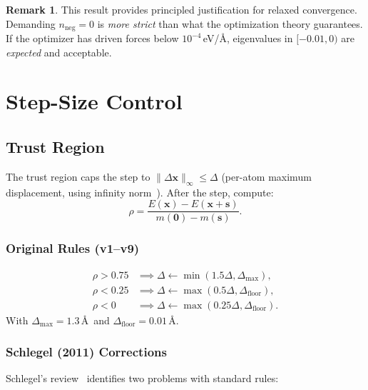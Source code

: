 \documentclass[11pt,a4paper]{article}
\newcommand{\vect}[1]{\bm{#1}}
\newcommand{\norm}[1]{\lVert #1 \rVert}
\theoremstyle{definition}
\newtheorem{remark}{Remark}
\begin{document}
\begin{remark}
  This result provides principled justification for relaxed convergence.
  Demanding $n_\text{neg}=0$ is \emph{more strict} than what the optimization
  theory guarantees.  If the optimizer has driven forces below $10^{-4}$\,eV/\AA,
  eigenvalues in $[-0.01, 0)$ are \emph{expected} and acceptable.
\end{remark}

\section{Step-Size Control}
\label{sec:step-control}

\subsection{Trust Region}
\label{sec:trust-region}

The trust region caps the step to $\norm{\Delta\vect{x}}_\infty \leq \Delta$
(per-atom maximum displacement, using infinity norm~\citep{sella}).  After the
step, compute:
\begin{equation}
  \rho = \frac{E(\vect{x}) - E(\vect{x}+\vect{s})}{m(\vect{0}) - m(\vect{s})}.
\end{equation}

\subsubsection{Original Rules (v1--v9)}
\begin{align}
  \rho > 0.75 &\implies \Delta \gets \min(1.5\Delta, \Delta_\text{max}), \\
  \rho < 0.25 &\implies \Delta \gets \max(0.5\Delta, \Delta_\text{floor}), \\
  \rho < 0    &\implies \Delta \gets \max(0.25\Delta, \Delta_\text{floor}).
\end{align}
With $\Delta_\text{max} = 1.3$\,\AA\ and $\Delta_\text{floor} = 0.01$\,\AA.

\subsubsection{Schlegel (2011) Corrections}
\label{sec:schlegel-tr}

Schlegel's review~\citep{schlegel2011} identifies two problems with standard
rules:
\end{document}
